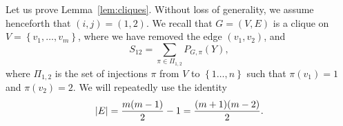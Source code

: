 \documentclass[final]{colt2026}
\newcommand{\1}{\mathbf{1}}
\newcommand{\ch}[1]{\textcolor{green}{#1}}
\newcommand{\bbE}{\mathbb{E}}
\newcommand{\pa}[1]{\left(#1\right)}
\newcommand{\ac}[1]{\left\{#1\right\}}
\newcommand{\cro}[1]{\left[#1\right]}
\begin{document}

Let us prove Lemma~\ref{lem:cliques}.
Without loss of generality, we assume henceforth that $(i,j)=(1,2)$. We recall that $G=(V,E)$ is a clique on $V=\ac{v_{1},\ldots,v_{m}}$, where we have removed the edge $(v_{1},v_{2})$, and 
$$S_{12}=\sum_{\pi \in \Pi_{1,2}} P_{G,\pi}(Y),$$
where $\Pi_{1,2}$ is the set of injections $\pi$ from $V$ to $\ac{1\ldots,n}$ such that $\pi(v_{1})=1$ and $\pi(v_{2})=2$.
We will  repeatedly  use the identity
$$|E|={m(m-1)\over 2}-1={(m+1)(m-2)\over 2}.$$
\end{document}

